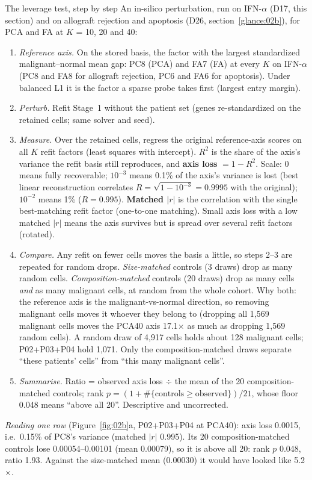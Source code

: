 \begin{explainbox}{The leverage test, step by step}
An in-silico perturbation, run on IFN-$\alpha$ (D17, this section) and on allograft rejection and apoptosis (D26, section~\ref{glance:02b}), for PCA and FA at $K$ = 10, 20 and 40:
\begin{enumerate}[label=\arabic*.,leftmargin=1.4em]
\item \emph{Reference axis.} On the stored basis, the factor with the largest standardized malignant--normal mean gap: PC8 (PCA) and FA7 (FA) at every $K$ on IFN-$\alpha$ (PC8 and FA8 for allograft rejection, PC6 and FA6 for apoptosis). Under balanced L1 it is the factor a sparse probe takes first (largest entry margin).
\item \emph{Perturb.} Refit Stage~1 without the patient set (genes re-standardized on the retained cells; same solver and seed).
\item \emph{Measure.} Over the retained cells, regress the original reference-axis scores on all $K$ refit factors (least squares with intercept). $R^2$ is the share of the axis's variance the refit basis still reproduces, and \textbf{axis loss} $= 1 - R^2$. Scale: 0 means fully recoverable; $10^{-3}$ means 0.1\% of the axis's variance is lost (best linear reconstruction correlates $R = \sqrt{1 - 10^{-3}} = 0.9995$ with the original); $10^{-2}$ means 1\% ($R = 0.995$). \textbf{Matched $|r|$} is the correlation with the single best-matching refit factor (one-to-one matching). Small axis loss with a low matched $|r|$ means the axis survives but is spread over several refit factors (rotated).
\item \emph{Compare.} Any refit on fewer cells moves the basis a little, so steps 2--3 are repeated for random drops. \emph{Size-matched} controls (3 draws) drop as many random cells. \emph{Composition-matched} controls (20 draws) drop as many cells \emph{and} as many malignant cells, at random from the whole cohort. Why both: the reference axis is the malignant-vs-normal direction, so removing malignant cells moves it whoever they belong to (dropping all 1,569 malignant cells moves the PCA40 axis 17.1$\times$ as much as dropping 1,569 random cells). A random draw of 4,917 cells holds about 128 malignant cells; P02+P03+P04 hold 1,071. Only the composition-matched draws separate ``these patients' cells'' from ``this many malignant cells''.
\item \emph{Summarise.} Ratio = observed axis loss $\div$ the mean of the 20 composition-matched controls; rank $p = (1 + \#\{\text{controls} \geq \text{observed}\})/21$, whose floor 0.048 means ``above all 20''. Descriptive and uncorrected.
\end{enumerate}
\emph{Reading one row} (Figure~\ref{fig:02b}a, P02+P03+P04 at PCA40): axis loss 0.0015, i.e.\ 0.15\% of PC8's variance (matched $|r|$ 0.995). Its 20 composition-matched controls lose 0.00054--0.00101 (mean 0.00079), so it is above all 20: rank $p$ 0.048, ratio 1.93. Against the size-matched mean (0.00030) it would have looked like 5.2$\times$.


\end{explainbox}
